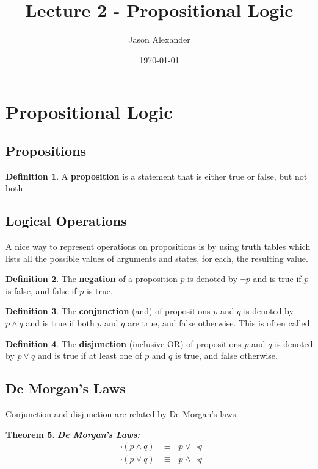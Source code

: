 \documentclass[12pt,a4paper]{article}
\title{Lecture 2 - Propositional Logic} %
\author{Jason Alexander} %
\date{\today}
\theoremstyle{plain}
\newtheorem{theorem}{Theorem}[section]
\theoremstyle{definition}
\newtheorem{definition}[theorem]{Definition}
\theoremstyle{remark}
\begin{document}
\maketitle
\tableofcontents
\newpage


\section{Propositional Logic}
\subsection{Propositions}
\begin{definition}
A \textbf{proposition} is a statement that is either true or false, but not both.
\end{definition}

\subsection{Logical Operations}
A nice way to represent operations on propositions is by using truth tables which lists all the possible values of arguments and states, for each, the resulting value.
\begin{definition}
The \textbf{negation} of a proposition $p$ is denoted by $\neg p$ and is true if $p$ is false, and false if $p$ is true.
\end{definition}

\begin{definition}
The \textbf{conjunction} (and) of propositions $p$ and $q$ is denoted by $p \land q$ and is true if both $p$ and $q$ are true, and false otherwise.
This is often called
\end{definition}

\begin{definition}
The \textbf{disjunction} (inclusive OR) of propositions $p$ and $q$ is denoted by $p \lor q$ and is true if at least one of $p$ and $q$ is true, and false otherwise.
\end{definition}

\subsection{De Morgan's Laws}
Conjunction and disjunction are related by De Morgan's laws.
\begin{theorem}
\textbf{De Morgan's Laws}:
\begin{align*}
\neg (p \land q) &\equiv \neg p \lor \neg q \\
\neg (p \lor q) &\equiv \neg p \land \neg q
\end{align*}
\end{theorem}
\end{document}
